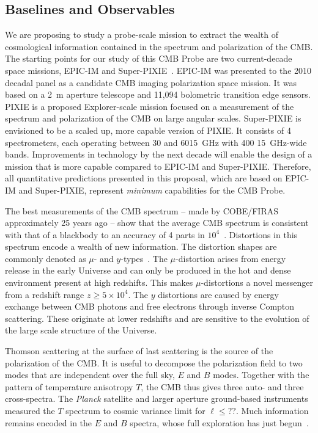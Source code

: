 
\subsection{Baselines and Observables}
\label{sec:observables}

\vspace{-0.05in}

We are proposing to study a probe-scale mission to extract the wealth 
of cosmological information contained in the spectrum and polarization of the \ac{CMB}. 
The starting points for our study of this CMB Probe are two current-decade space missions, 
EPIC-IM and Super-PIXIE~\cite{bock2009, Kogut2011PIXIE}. EPIC-IM was presented 
to the 2010 decadal panel as a candidate \ac{CMB} imaging polarization space mission. 
It was based on a 2~m aperture telescope and 11,094 bolometric transition edge sensors. 
PIXIE is a proposed Explorer-scale mission focused on a measurement of the spectrum 
and polarization of the CMB on large angular scales. Super-PIXIE is envisioned to be a scaled up, 
more capable version of PIXIE. It consists of 4 spectrometers, each operating between 
30 and 6015~GHz with 400 15~GHz-wide bands. Improvements in technology by the next decade will enable 
the design of a mission that is more capable compared to EPIC-IM and Super-PIXIE. Therefore, all 
quantitative predictions presented in this proposal, which are based on EPIC-IM and Super-PIXIE, 
represent {\it minimum} capabilities for the CMB Probe. 

The best measurements of the \ac{CMB} spectrum -- made by COBE/FIRAS approximately 25 years ago --
show that the average CMB spectrum is consistent with that of a blackbody to an accuracy of 4 parts 
in $10^{4}$~\cite{Mather1994, Fixsen1996}. Distortions in this spectrum encode a wealth of new information.
The distortion shapes are commonly denoted as $\mu$- and $y$-types~\cite{Zeldovich1969, Sunyaev1970mu}. The 
$\mu$-distortion arises from energy release in the early Universe and can only be produced in the hot and dense 
environment present at high redshifts. This makes $\mu$-distortions a novel messenger from a redshift 
range $ z \geq 5\times10^{4} $. The $y$ distortions are caused by 
energy exchange between \ac{CMB} photons and free electrons through inverse Compton 
scattering. These originate at lower redshifts and are sensitive to the 
evolution of the large scale structure of the Universe. 

Thomson scattering at the surface of last scattering is the source of the polarization of the \ac{CMB}. It is useful 
to decompose the polarization field to two modes that are independent over the full sky, $E$ and $B$ modes. 
Together with the pattern of temperature anisotropy $T$, the \ac{CMB} thus gives three auto- and three cross-spectra. 
The {\it Planck} satellite and larger aperture ground-based instruments measured the $T$ spectrum to cosmic
variance limit for $\ell \leq ??$. Much information remains encoded in the $E$ and $B$ spectra, whose full exploration 
has just begun~\cite{planck,spt,polarbear,bicep}.   


